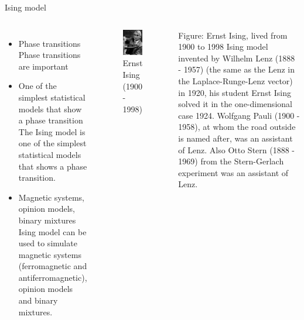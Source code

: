 \documentclass[]{beamer}
\begin{document}
\begin{frame}{Ising model}
\begin{columns}[c]
	\begin{itemize}
		\item<2-> Phase transitions
			 {Phase transitions are important}
		\item<3-> One of the simplest statistical models that show a phase transition
			 {The Ising model is one of the simplest statistical models that shows a phase transition.}
		\item<4-> Magnetic systems, opinion models, binary mixtures
			 {Ising model can be used to simulate magnetic systems (ferromagnetic and antiferromagnetic), opinion models and binary mixtures.}
	\end{itemize}
	\pause[5]
	\begin{figure}[p]
		\centering
		\includegraphics{img/ising.jpg}
		\caption{Ernst Ising (1900 - 1998)}
		\label{fig:awesome_image}
	\end{figure}
	 {Figure: Ernst Ising, lived from 1900 to 1998}
	 {Ising model invented by Wilhelm Lenz (1888 - 1957) (the same as the Lenz in the Laplace-Runge-Lenz vector) in 1920, his student Ernst Ising solved it in the one-dimensional case 1924.}
	 {Wolfgang Pauli (1900 - 1958), at whom the road outside is named after, was an assistant of Lenz.}
	 {Also Otto Stern (1888 - 1969) from the Stern-Gerlach experiment was an assistant of Lenz.}
\end{columns}
\end{frame}
\end{document}
